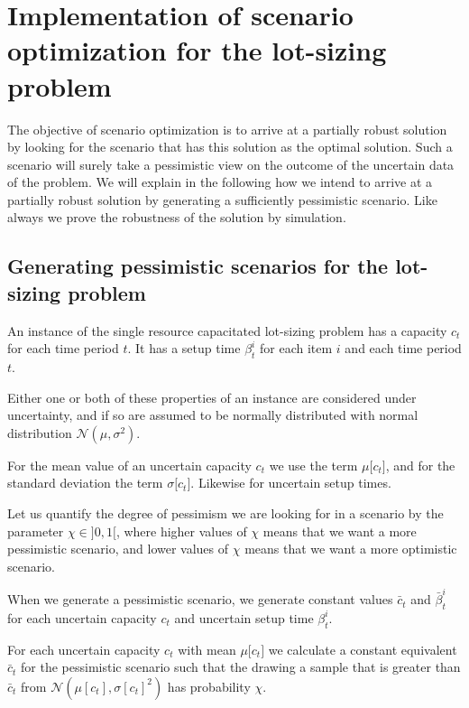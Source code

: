 \section{Implementation of scenario optimization for the lot-sizing problem}
\label{sec:methods_scenario_optimization}

The objective of scenario optimization is to arrive at a partially
robust solution by looking for the scenario that has this solution as
the optimal solution. Such a scenario will surely take a pessimistic
view on the outcome of the uncertain data of the
problem. We will explain in the following how we intend to arrive at a
partially robust solution by generating a sufficiently pessimistic
scenario. Like always we prove the robustness of the solution by
simulation.

\subsection{Generating pessimistic scenarios for the lot-sizing problem}

An instance of the single resource capacitated lot-sizing problem has a capacity $c_t$ for
each time period $t$. It has a setup time $\beta_t^i$ for each item $i$ and each time period $t$.

Either one or both of these properties of an instance are considered
under uncertainty, and if so are assumed to be normally distributed with normal distribution $\mathcal{N}(\mu, \sigma^2)$.

For the mean value of an uncertain capacity $c_t$ we use the term $\mu
\lbrack c_t \rbrack$, and for the standard deviation the term $\sigma
\lbrack c_t \rbrack$. Likewise for uncertain setup times.

Let us quantify the degree of pessimism we are looking for in a
scenario by the parameter $\chi \in \rbrack 0, 1 \lbrack$, where higher values of $\chi$ means
that we want a more pessimistic scenario, and lower values of $\chi$ means that
we want a more optimistic scenario.

When we generate a pessimistic scenario, we generate constant
values $\bar{c}_t$ and $\bar{\beta}^i_t$ for each uncertain capacity $c_t$ and uncertain setup time $\beta_t^i$.

For each uncertain capacity $c_t$ with mean $\mu \lbrack c_t \rbrack$
we calculate a constant equivalent $\bar{c}_t$ for the pessimistic
scenario such that the drawing a sample that is greater than
$\bar{c}_t$ from $\mathcal{N}(\mu[c_t], \sigma[c_t]^2)$ has
probability $\chi$.

